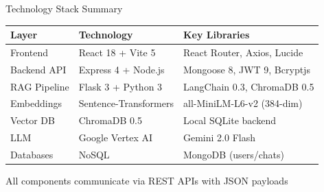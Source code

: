 \documentclass[11pt,aspectratio=16:9]{beamer}
\begin{document}
\begin{frame}{Technology Stack Summary}
    \begin{center}
        \begin{tabular}{|l|l|l|}
            \hline
            \textbf{Layer} & \textbf{Technology} & \textbf{Key Libraries} \\
            \hline
            Frontend & React 18 + Vite 5 & React Router, Axios, Lucide \\
            \hline
            Backend API & Express 4 + Node.js & Mongoose 8, JWT 9, Bcryptjs \\
            \hline
            RAG Pipeline & Flask 3 + Python 3 & LangChain 0.3, ChromaDB 0.5 \\
            \hline
            Embeddings & Sentence-Transformers & all-MiniLM-L6-v2 (384-dim) \\
            \hline
            Vector DB & ChromaDB 0.5 & Local SQLite backend \\
            \hline
            LLM & Google Vertex AI & Gemini 2.0 Flash \\
            \hline
            Databases & NoSQL & MongoDB (users/chats) \\
            \hline
        \end{tabular}
    \end{center}
    
    \vspace{0.5cm}
    {\small All components communicate via REST APIs with JSON payloads}
\end{frame}
\end{document}
